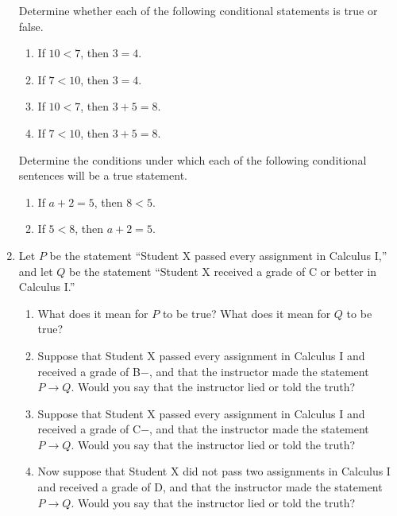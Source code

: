 \begin{enumerate}
\xitem \label{exer:sec11-3}%
Determine whether each of the following conditional statements is true or false. 
\begin{multicols}{2}
  \begin{enumerate}
  \item If $ 10 < 7$, then $3 = 4$.

  \item If  $7 < 10$, then  $3 = 4$.

  \item If $10 < 7$, then $3 + 5 = 8$.

  \item If $7 < 10$, then $3 + 5 =8$.

\end{enumerate}
\end{multicols}

\xitem \label{exer:sec11-4}%
Determine the conditions under which each of the following conditional sentences will be a true statement. 
\begin{multicols}{2}
  \begin{enumerate}
  \item If $a+2=5$, then $8<5$.

  \item If $5<8$, then $a+2=5$.
\end{enumerate}
\end{multicols}

\item Let  $P$  be the statement ``Student X passed every assignment in Calculus I,'' and let  $Q$  be the statement ``Student X received a grade of  C  or better in Calculus I.''
\label{exer:sec11-5}%
  \begin{enumerate}
  \item What does it mean for  $P$  to be true?  What does it mean for  $Q$  to be true?
  
  \item \label{exer:conditionalb}%
Suppose that  Student X passed every assignment in Calculus I and received a grade of 
B$-$, and  that  the instructor made the statement  $P \to Q$.  Would you say that the instructor lied or told the truth? 

  \item \label{exer:conditionalc}%
Suppose that Student X passed every assignment in Calculus I and received a grade of  C$-$,  and that the instructor made the statement  $P \to Q$.  Would you say that the instructor lied or told the truth? 

  \item \label{exer:conditionald}%
Now suppose that Student X did not pass two assignments in Calculus I and received a grade of  D, and that the instructor made the statement  $P \to Q$.  Would you say that the instructor lied or told the truth? 


\end{enumerate}
\end{enumerate}
